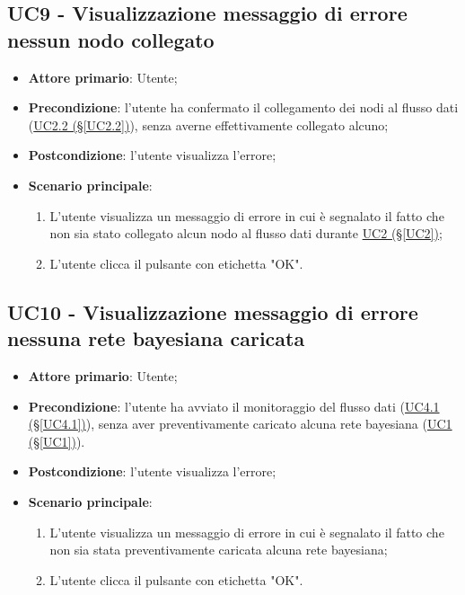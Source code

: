 \pagebreak

\subsection{UC9 - Visualizzazione messaggio di errore nessun nodo collegato}\label{UC9}
\begin{itemize}
\item \textbf{Attore primario}: Utente;
\item \textbf{Precondizione}: l'utente ha confermato il collegamento dei nodi al flusso dati (\hyperref[UC2.2]{UC2.2 (§\ref*{UC2.2})}), senza averne effettivamente collegato alcuno;
\item \textbf{Postcondizione}: l'utente visualizza l'errore;
\item \textbf{Scenario principale}: 
	\begin{enumerate}
	\item L'utente visualizza un messaggio di errore in cui è segnalato il fatto che non sia stato collegato alcun 				nodo al flusso dati durante \hyperref[UC2]{UC2 (§\ref*{UC2})};
	\item L'utente clicca il pulsante con etichetta "OK".
	\end{enumerate}
\end{itemize}

\pagebreak

\subsection{UC10 - Visualizzazione messaggio di errore nessuna rete bayesiana caricata}\label{UC10}
\begin{itemize}
\item \textbf{Attore primario}: Utente;
\item \textbf{Precondizione}: l'utente ha avviato il monitoraggio del flusso dati (\hyperref[UC4.1]{UC4.1 (§\ref*{UC4.1})}), senza aver preventivamente caricato alcuna rete bayesiana (\hyperref[UC1]{UC1 (§\ref*{UC1})}).
\item \textbf{Postcondizione}: l'utente visualizza l'errore;
\item \textbf{Scenario principale}: 
	\begin{enumerate}
	\item L'utente visualizza un messaggio di errore in cui è segnalato il fatto che non sia stata preventivamente 				caricata alcuna rete bayesiana;
	\item L'utente clicca il pulsante con etichetta "OK".
	\end{enumerate}
\end{itemize}

